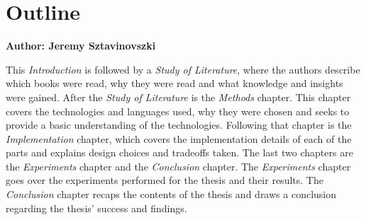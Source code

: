 \section{Outline}
\textbf{Author: Jeremy Sztavinovszki}

This \textit{Introduction} is followed by a \textit{Study of Literature}, where the authors describe which books were read, why they were read and what knowledge and insights were gained.
After the \textit{Study of Literature} is the \textit{Methods} chapter. This chapter covers the technologies and languages used, why they were chosen and seeks to provide a basic understanding of the 
technologies. Following that chapter is the
\textit{Implementation} chapter, which covers the implementation details of each of the parts and explains design choices and tradeoffs taken. The last two chapters are the
\textit{Experiments} chapter and the \textit{Conclusion} chapter. The \textit{Experiments} chapter goes over the experiments performed for the thesis and their results. The \textit{Conclusion} chapter
recaps the contents of the thesis and draws a conclusion regarding the thesis' success and findings.

\filbreak
